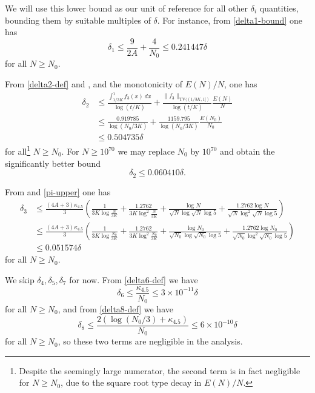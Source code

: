 \documentclass[10pt,a4paper,reqno]{amsart}
\numberwithin{equation}{section}
\theoremstyle{plain}
\theoremstyle{definition}
\begin{document}
We will use this lower bound as our unit of reference for all other $\delta_i$ quantities, bounding them by suitable multiples of $\delta$.  For instance, from \eqref{delta1-bound} one has
$$ \delta_1 \leq \frac{9}{2A} + \frac{4}{N_0} \leq 0.241447 \delta$$
for all $N \geq N_0$.

From \eqref{delta2-def} and , and the monotonicity of $E(N)/N$, one has
\begin{align*}
  \delta_2 &\leq \frac{\int_{1/3K}^1 f_3(x)\ dx}{\log(t/K)}  + \frac{\|f_3\|_{\mathrm{TV}((1/3K,1])}}{\log(t/K)}  \frac{E(N)}{N} \\
  &\leq \frac{0.919785}{\log(N_0/3K)}  + \frac{1159.795}{\log(N_0/3K)}  \frac{E(N_0)}{N_0} \\
  &\leq 0.504735 \delta
\end{align*}
for all\footnote{Despite the seemingly large numerator, the second term is in fact negligible for $N \geq N_0$, due to the square root type decay in $E(N)/N$.} $N \geq N_0$.  For $N \geq 10^{70}$ we may replace $N_0$ by $10^{70}$ and obtain the significantly better bound
$$ \delta_2 \leq 0.060410 \delta.$$

From  and \eqref{pi-upper} one has
\begin{align*}
\delta_3 &\leq \frac{(4A+3)\kappa_{4.5}}{3} \left(\!
\frac{1}{3K \log \frac{N}{3K}} + \frac{1.2762}{3K \log^2\! \frac{N}{3K}}
+ \frac{\log N}{\sqrt{N} \log\! \sqrt{N}\log 5 } + \frac{1.2762 \log N}{\sqrt{N} \log^2\!\! \sqrt{N}\log 5 } \!\right) \\
&\leq \frac{(4A+3)\kappa_{4.5}}{3} \left(\!
  \frac{1}{3K \log\frac{N_0}{3K}} + \frac{1.2762}{3K \log^2\!\frac{N_0}{3K}}
  + \frac{\log N_0}{\sqrt{N_0} \log\! \sqrt{N_0}\log 5 } + \frac{1.2762 \log N_0}{\sqrt{N_0} \log^2\!\! \sqrt{N_0}\log 5 }\! \right) \\
&\leq 0.051574 \delta
\end{align*}
for all $N \geq N_0$.

We skip $\delta_4, \delta_5, \delta_7$ for now.  From \eqref{delta6-def} we have
$$ \delta_6 \leq \frac{\kappa_{4.5}}{N_0} \leq 3 \times 10^{-11} \delta$$
for all $N \geq N_0$, and from \eqref{delta8-def} we have
$$ \delta_8 \leq \frac{2(\log(N_0/3) + \kappa_{4.5})}{N_0} \leq 6 \times 10^{-10} \delta$$
for all $N \geq N_0$, so these two terms are negligible in the analysis.
\end{document}

